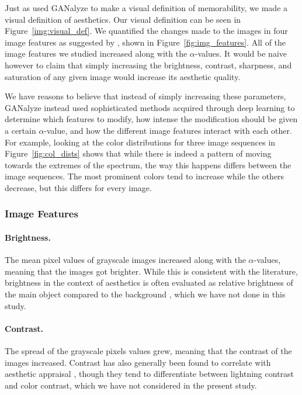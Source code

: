 \documentclass[../main.tex]{subfiles}
\begin{document}
Just as \textcite{goetschalckxGANalyzeVisualDefinitions2019} used GANalyze to make a visual definition of memorability, we made a visual definition of aesthetics. Our visual definition can be seen in Figure~\ref{img:visual_def}. We quantified the changes made to the images in four image features as suggested by \textcite{ke2006design}, shown in Figure~\ref{fig:img_features}. All of the image features we studied increased along with the $\alpha$-values. It would be naive however to claim that simply increasing the brightness, contrast, sharpness, and saturation of any given image would increase its aesthetic quality.

We have reasons to believe that instead of simply increasing these parameters, GANalyze instead used sophisticated methods acquired through deep learning to determine which features to modify, how intense the modification should be given a certain $\alpha$-value, and how the different image features interact with each other. For example, looking at the color distributions for three image sequences in Figure~\ref{fig:col_dists} shows that while there is indeed a pattern of moving towards the extremes of the spectrum, the way this happens differs between the image sequences. The most prominent colors tend to increase while the others decrease, but this differs for every image.

\subsubsection{Image Features}
\paragraph{Brightness.} The mean pixel values of grayscale images increased along with the $\alpha$-values, meaning that the images got brighter. While this is consistent with the literature, brightness in the context of aesthetics is often evaluated as relative brightness of the main object compared to the background \parencite{ke2006design, obrador2010role}, which we have not done in this study. 

\paragraph{Contrast.} The spread of the grayscale pixels values grew, meaning that the contrast of the images increased. Contrast has also generally been found to correlate with aesthetic appraisal \parencite{wong2009saliency}, though they tend to differentiate between lightning contrast and color contrast, which we have not considered in the present study.
\end{document}

